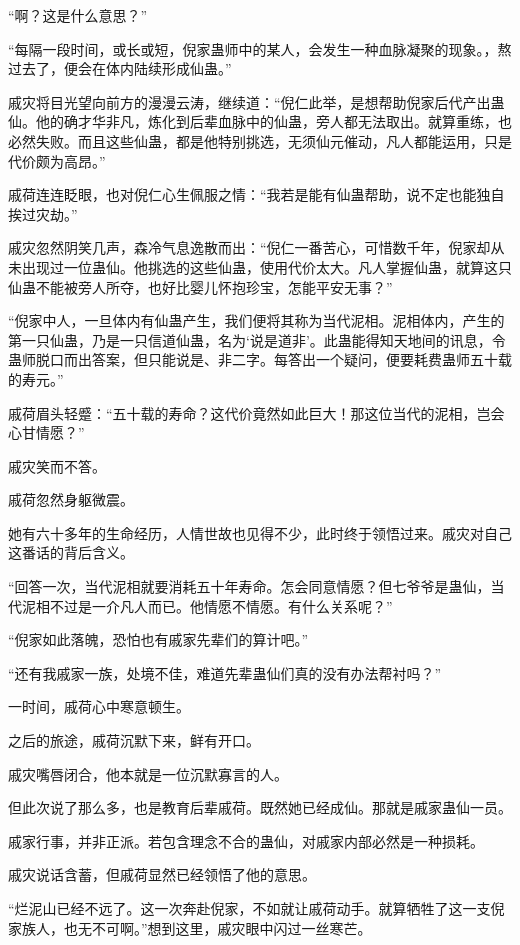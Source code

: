 
\begin{this_body}

“啊？这是什么意思？”

“每隔一段时间，或长或短，倪家蛊师中的某人，会发生一种血脉凝聚的现象。，熬过去了，便会在体内陆续形成仙蛊。”

戚灾将目光望向前方的漫漫云涛，继续道：“倪仁此举，是想帮助倪家后代产出蛊仙。他的确才华非凡，炼化到后辈血脉中的仙蛊，旁人都无法取出。就算重练，也必然失败。而且这些仙蛊，都是他特别挑选，无须仙元催动，凡人都能运用，只是代价颇为高昂。”

戚荷连连眨眼，也对倪仁心生佩服之情：“我若是能有仙蛊帮助，说不定也能独自挨过灾劫。”

戚灾忽然阴笑几声，森冷气息逸散而出：“倪仁一番苦心，可惜数千年，倪家却从未出现过一位蛊仙。他挑选的这些仙蛊，使用代价太大。凡人掌握仙蛊，就算这只仙蛊不能被旁人所夺，也好比婴儿怀抱珍宝，怎能平安无事？”

“倪家中人，一旦体内有仙蛊产生，我们便将其称为当代泥相。泥相体内，产生的第一只仙蛊，乃是一只信道仙蛊，名为‘说是道非’。此蛊能得知天地间的讯息，令蛊师脱口而出答案，但只能说是、非二字。每答出一个疑问，便要耗费蛊师五十载的寿元。”

戚荷眉头轻蹙：“五十载的寿命？这代价竟然如此巨大！那这位当代的泥相，岂会心甘情愿？”

戚灾笑而不答。

戚荷忽然身躯微震。

她有六十多年的生命经历，人情世故也见得不少，此时终于领悟过来。戚灾对自己这番话的背后含义。

“回答一次，当代泥相就要消耗五十年寿命。怎会同意情愿？但七爷爷是蛊仙，当代泥相不过是一介凡人而已。他情愿不情愿。有什么关系呢？”

“倪家如此落魄，恐怕也有戚家先辈们的算计吧。”

“还有我戚家一族，处境不佳，难道先辈蛊仙们真的没有办法帮衬吗？”

一时间，戚荷心中寒意顿生。

之后的旅途，戚荷沉默下来，鲜有开口。

戚灾嘴唇闭合，他本就是一位沉默寡言的人。

但此次说了那么多，也是教育后辈戚荷。既然她已经成仙。那就是戚家蛊仙一员。

戚家行事，并非正派。若包含理念不合的蛊仙，对戚家内部必然是一种损耗。

戚灾说话含蓄，但戚荷显然已经领悟了他的意思。

“烂泥山已经不远了。这一次奔赴倪家，不如就让戚荷动手。就算牺牲了这一支倪家族人，也无不可啊。”想到这里，戚灾眼中闪过一丝寒芒。


\end{this_body}
